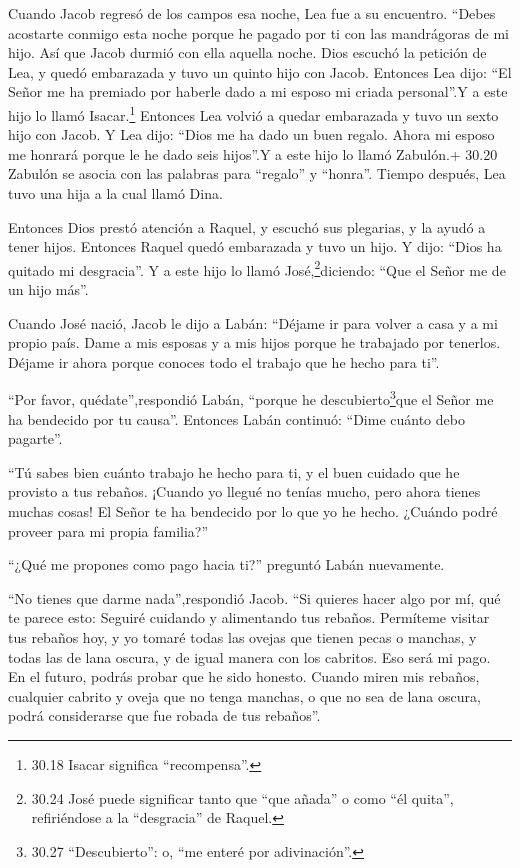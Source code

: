  Cuando Jacob regresó de los campos esa noche, Lea fue a su
encuentro. ``Debes acostarte conmigo esta noche porque he pagado por ti
con las mandrágoras de mi hijo. Así que Jacob durmió con ella aquella
noche.  Dios escuchó la petición de Lea, y quedó embarazada
y tuvo un quinto hijo con Jacob.  Entonces Lea dijo: ``El
Señor me ha premiado por haberle dado a mi esposo mi criada personal''.Y
a este hijo lo llamó Isacar.\footnote{30.18 Isacar significa
  ``recompensa''.}  Entonces Lea volvió a quedar embarazada
y tuvo un sexto hijo con Jacob.  Y Lea dijo: ``Dios me ha
dado un buen regalo. Ahora mi esposo me honrará porque le he dado seis
hijos''.Y a este hijo lo llamó Zabulón.+ 30.20 Zabulón se asocia con las
palabras para ``regalo'' y ``honra''.  Tiempo después, Lea
tuvo una hija a la cual llamó Dina.

 Entonces Dios prestó atención a Raquel, y escuchó sus
plegarias, y la ayudó a tener hijos.  Entonces Raquel quedó
embarazada y tuvo un hijo. Y dijo: ``Dios ha quitado mi desgracia''.
 Y a este hijo lo llamó José,\footnote{30.24 José puede
  significar tanto que ``que añada'' o como ``él quita'', refiriéndose a
  la ``desgracia'' de Raquel.}diciendo: ``Que el Señor me de un hijo
más''.

 Cuando José nació, Jacob le dijo a Labán: ``Déjame ir para
volver a casa y a mi propio país.  Dame a mis esposas y a
mis hijos porque he trabajado por tenerlos. Déjame ir ahora porque
conoces todo el trabajo que he hecho para ti''.

 ``Por favor, quédate'',respondió Labán, ``porque he
descubierto\footnote{30.27 ``Descubierto'': o, ``me enteré por
  adivinación''.}que el Señor me ha bendecido por tu causa''.
 Entonces Labán continuó: ``Dime cuánto debo pagarte''.

 ``Tú sabes bien cuánto trabajo he hecho para ti, y el buen
cuidado que he provisto a tus rebaños.  ¡Cuando yo llegué
no tenías mucho, pero ahora tienes muchas cosas! El Señor te ha
bendecido por lo que yo he hecho. ¿Cuándo podré proveer para mi propia
familia?''

 ``¿Qué me propones como pago hacia ti?'' preguntó Labán
nuevamente.

``No tienes que darme nada'',respondió Jacob. ``Si quieres hacer algo
por mí, qué te parece esto: Seguiré cuidando y alimentando tus rebaños.
 Permíteme visitar tus rebaños hoy, y yo tomaré todas las
ovejas que tienen pecas o manchas, y todas las de lana oscura, y de
igual manera con los cabritos. Eso será mi pago.  En el
futuro, podrás probar que he sido honesto. Cuando miren mis rebaños,
cualquier cabrito y oveja que no tenga manchas, o que no sea de lana
oscura, podrá considerarse que fue robada de tus rebaños''.

